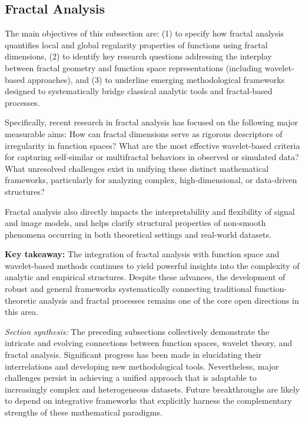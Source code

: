 \documentclass[sigconf]{acmart}
\begin{document}
\subsection{Fractal Analysis}

The main objectives of this subsection are: (1) to specify how fractal analysis quantifies local and global regularity properties of functions using fractal dimensions, (2) to identify key research questions addressing the interplay between fractal geometry and function space representations (including wavelet-based approaches), and (3) to underline emerging methodological frameworks designed to systematically bridge classical analytic tools and fractal-based processes.

Specifically, recent research in fractal analysis has focused on the following major measurable aims: How can fractal dimensions serve as rigorous descriptors of irregularity in function spaces? What are the most effective wavelet-based criteria for capturing self-similar or multifractal behaviors in observed or simulated data? What unresolved challenges exist in unifying these distinct mathematical frameworks, particularly for analyzing complex, high-dimensional, or data-driven structures?

Fractal analysis also directly impacts the interpretability and flexibility of signal and image models, and helps clarify structural properties of non-smooth phenomena occurring in both theoretical settings and real-world datasets.

\textbf{Key takeaway:} The integration of fractal analysis with function space and wavelet-based methods continues to yield powerful insights into the complexity of analytic and empirical structures. Despite these advances, the development of robust and general frameworks systematically connecting traditional function-theoretic analysis and fractal processes remains one of the core open directions in this area.

\vspace{1em}

\noindent
\textit{Section synthesis:} The preceding subsections collectively demonstrate the intricate and evolving connections between function spaces, wavelet theory, and fractal analysis. Significant progress has been made in elucidating their interrelations and developing new methodological tools. Nevertheless, major challenges persist in achieving a unified approach that is adaptable to increasingly complex and heterogeneous datasets. Future breakthroughs are likely to depend on integrative frameworks that explicitly harness the complementary strengths of these mathematical paradigms.
\end{document}
